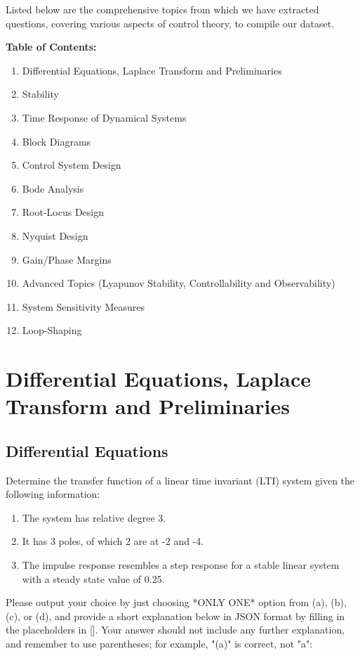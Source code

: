 \documentclass[12pt]{article}
\begin{document}
Listed below are the comprehensive topics from which we have extracted questions, covering various aspects of control theory, to compile our dataset.

\textbf{Table of Contents:}
\begin{enumerate}
    \item Differential Equations, Laplace Transform and Preliminaries
    \item Stability
    \item Time Response of Dynamical Systems
    \item Block Diagrams
    \item Control System Design
    \item Bode Analysis
    \item Root-Locus Design
    \item Nyquist Design
    \item Gain/Phase Margins
    \item Advanced Topics (Lyapunov Stability, Controllability and Observability)
    \item System Sensitivity Measures
    \item Loop-Shaping
\end{enumerate}


\clearpage

\section{Differential Equations, Laplace Transform and Preliminaries}

\subsection{Differential Equations}
Determine the transfer function of a linear time invariant (LTI) system given the following information:
\begin{enumerate}
    \item The system has relative degree 3.
    \item It has 3 poles, of which 2 are at -2 and -4.
    \item The impulse response resembles a step response for a stable linear system with a steady state value of 0.25.
\end{enumerate}

Please output your choice by just choosing *ONLY ONE* option from (a), (b), (c), or (d), and provide a short explanation below in JSON format by filling in the placeholders in []. Your answer should not include any further explanation, and remember to use parentheses; for example, "(a)" is correct, not "a":
\end{document}

